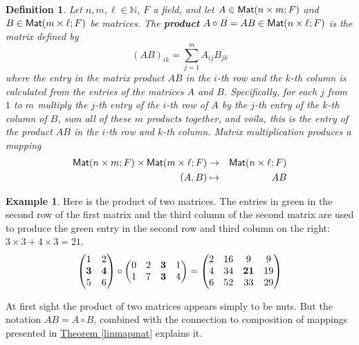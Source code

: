 \documentclass[11pt]{amsbook}
\newtheorem{definition}[theorem]{Definition}
\theoremstyle{definition}
\newtheorem{ex}[theorem]{Example}
\begin{document}
\begin{definition}\label{matmult}
Let $n, m, \ell \in \mathbb{N}$, $F$ a field, and let $A\in {\sf Mat}(n\times m ;F)$ and $B\in{\sf Mat}(m\times \ell ;F)$ be matrices. The {\bf product} $A\circ B = AB \in {\sf Mat}(n\times \ell; F)$ is the matrix defined by $$(AB)_{ik} = \sum_{j=1}^m A_{ij}B_{jk}$$ where the entry in the matrix product $AB$ in the $i$-th row and the $k$-th column is calculated from the entries of the matrices $A$ and $B$. Specifically, for each $j$ from $1$ to $m$ multiply the $j$-th entry of the $i$-th row of $A$ by the $j$-th entry of the $k$-th column of $B$, sum all of these $m$ products together, and voila, this is the entry of the product $AB$ in the $i$-th row and $k$-th column. Matrix multiplication produces a mapping \begin{eqnarray*}{\sf Mat}(n\times m; F) \times {\sf Mat}(m\times \ell; F) &\to & {\sf Mat}(n\times \ell; F) \\
(A,B) & \mapsto & AB
\end{eqnarray*}
\end{definition}
\begin{ex} Here is the product of two matrices. The entries in green in the second row of the first matrix and the third column of the second matrix are used to produce the green entry in the second row and third column on the right: $3\times 3 + 4\times 3 = 21$.
$$\begin{pmatrix} 1 &2 \\ {\bf 3}& {\bf 4}\\ 5&6 \end{pmatrix} \circ \begin{pmatrix} 0 &2 & {\bf 3} & 1 \\ 1 & 7 & {\bf 3} & 4 \end{pmatrix} = \begin{pmatrix} 2 & 16 & 9 & 9 \\ 4 & 34 & {\bf 21} & 19 \\ 6 & 52 & 33 & 29 \end{pmatrix}
$$
  \end{ex}

 At first sight the product of two matrices appears simply to be nuts. But the notation $AB = A\circ B$, combined with the connection to composition of mappings presented in \hyperref[linmapmat]{Theorem \ref{linmapmat}} explains it.
\end{document}
